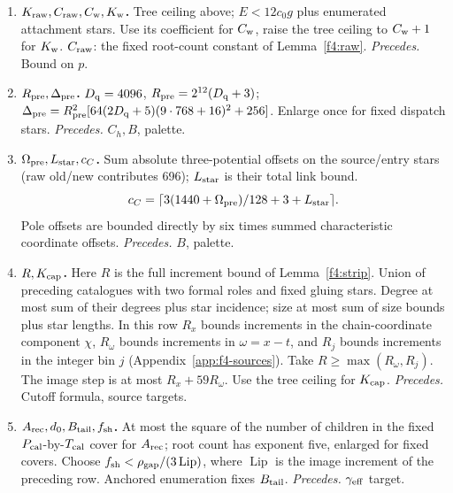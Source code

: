 \begin{enumerate}[label=\arabic*.,leftmargin=2em]
\item \textbf{\boldmath\(K_{\rm raw},C_{\rm raw},C_{\rm w},K_{\rm w}\).} Tree ceiling above;
\(E<12c_0g\) plus enumerated attachment stars. Use its coefficient
for \(C_{\rm w}\), raise the tree ceiling to \(C_{\rm w}+1\) for
\(K_{\rm w}\). \(C_{\rm raw}\): the fixed root-count constant of
Lemma~\ref{f4:raw}.
\emph{Precedes.} Bound on \(p\).

\item \textbf{\boldmath\(R_{\rm pre},\Delta_{\rm pre}\).} \(D_{\rm q}=4096\),
\(R_{\rm pre}=2^{12}(D_{\rm q}+3)\);
\(\Delta_{\rm pre}=R_{\rm pre}^2[64(2D_{\rm q}+5)(9\cdot768+16)^2+256]\).
Enlarge once for fixed dispatch stars.
\emph{Precedes.} \(C_h,B\), palette.

\item \textbf{\boldmath\(\Omega_{\rm pre},L_{\rm star},c_C\).} Sum absolute three-potential offsets
on the source/entry stars (raw old/new contributes 696);
\(L_{\rm star}\) is their total link bound.
\[
 c_C=\lceil3(1440+\Omega_{\rm pre})/128+3+L_{\rm star}\rceil.
\]
Pole offsets are bounded directly by six times summed characteristic
coordinate offsets.
\emph{Precedes.} \(B\), palette.

\item \textbf{\boldmath\(R,K_{\rm cap}\).} Here \(R\) is the full increment bound of Lemma~\ref{f4:strip}. Union of preceding
catalogues with two formal roles and fixed gluing stars. Degree at most
sum of their degrees plus star incidence; size at most sum of size
bounds plus star lengths. In this row \(R_x\) bounds increments in the chain-coordinate component
\(\chi\), \(R_\omega\) bounds increments in \(\omega=x-t\), and \(R_j\)
bounds increments in the integer bin \(j\)
(Appendix~\ref{app:f4-sources}). Take \(R\ge\max(R_\omega,R_j)\).
The image step is at most \(R_x+59R_\omega\).
Use the tree ceiling for \(K_{\rm cap}\).
\emph{Precedes.} Cutoff formula, source targets.

\item \textbf{\boldmath\(A_{\rm rec},d_0,B_{\rm tail},f_{\rm sh}\).} At most the square
of the number of children in the fixed \mbox{\(P_{\rm cal}\)-by-\(T_{\rm cal}\)} cover for
\(A_{\rm rec}\); root count has exponent five, enlarged for fixed
covers. Choose \mbox{\(f_{\rm sh}<\rho_{\rm gap}/(3\operatorname{Lip})\)},
where \(\operatorname{Lip}\) is the image increment of the preceding row.
Anchored enumeration fixes \(B_{\rm tail}\).
\emph{Precedes.} \(\gamma_{\rm eff}\) target.
\end{enumerate}

